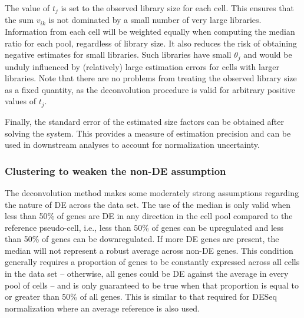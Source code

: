 \documentclass{bmcart}
\newcommand{\revised}[1]{#1}
\begin{document}
The value of $t_j$ is set to the observed library size for each cell.
This ensures that the sum \revised{$v_{ik}$} is not dominated by a small number of very large libraries.
Information from each cell will be weighted equally when computing the median ratio for each \revised{pool}, regardless of library size.
It also reduces the risk of obtaining negative estimates for small libraries.
Such libraries have small $\theta_j$ and would be unduly influenced by (relatively) large estimation errors for cells with larger libraries.
Note that there are no problems from treating the observed library size as a fixed quantity, as the deconvolution procedure is valid for arbitrary positive values of $t_j$.

\revised{Finally, the standard error of the estimated size factors can be obtained after solving the system.
This provides a measure of estimation precision and can be used in downstream analyses to account for normalization uncertainty.}

\subsubsection*{Clustering to weaken the non-DE assumption}
The deconvolution method makes some moderately strong assumptions regarding the nature of DE across the data set.
The use of the median is only valid when less than 50\% of genes are DE in any direction in the cell pool compared to the reference pseudo-cell,
    i.e., less than 50\% of genes can be upregulated and less than 50\% of genes can be downregulated.
If more DE genes are present, the median will not represent a robust average across non-DE genes.
This condition generally requires a proportion of genes to be constantly expressed across all cells in the data set 
    -- otherwise, all genes could be DE against the average in every pool of cells -- 
    and is only guaranteed to be true when that proportion is equal to or greater than 50\% of all genes.
This is similar to that required for DESeq normalization where an average reference is also used.

\end{document}
